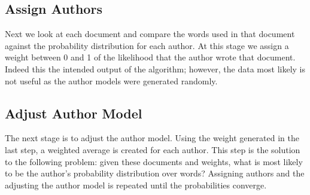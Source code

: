 \subsection{Assign Authors}
Next we look at each document and compare the words used in that document against the probability distribution for each author.  At this stage we assign a weight between 0 and 1 of the likelihood that the author wrote that document.  Indeed this the intended output of the algorithm; however, the data most likely is not useful as the author models were generated randomly.

\subsection{Adjust Author Model}
The next stage is to adjust the author model.  Using the weight generated in the last step, a weighted average is created for each author.  This step is the solution to the following problem: given these documents and weights, what is most likely to be the author's probability distribution over words?  Assigning authors and the adjusting the author model is repeated until the probabilities converge.

